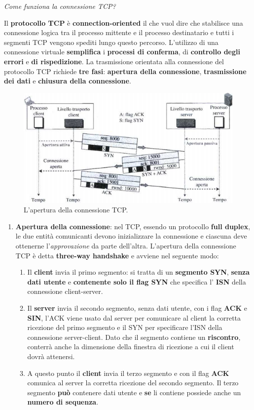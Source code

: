 \documentclass[11pt,a4paper]{article}
\theoremstyle{definition}
\begin{document}
\begin{flushleft}
	\textit{Come funziona la connessione TCP?}
\end{flushleft}
Il \textbf{protocollo TCP} è \textbf{connection-oriented} il che vuol dire che stabilisce una connessione logica tra il processo mittente e il processo destinatario e tutti i segmenti TCP vengono spediti lungo questo percorso. L'utilizzo di una connessione virtuale \textbf{semplifica} i \textbf{processi di conferma}, di \textbf{controllo degli errori} e \textbf{di rispedizione}. La trasmissione orientata alla connessione del protocollo TCP richiede \textbf{tre fasi}: \textbf{apertura della connessione}, \textbf{trasmissione dei dati} e \textbf{chiusura della connessione}.
\begin{figure}[!h]
	\includegraphics[scale=0.44]{Immagini/Three_way.png}
	\centering
	\caption{L'apertura della connessione TCP.}
\end{figure}
\newpage
\begin{enumerate}
	\item \textbf{Apertura della connessione}: nel TCP, essendo un protocollo \textbf{full duplex}, le due entità comunicanti devono inizializzare la connessione e ciascuna deve ottenerne l'\textit{approvazione} da parte dell'altra. L'apertura della connessione TCP è detta \textbf{three-way handshake} e avviene nel seguente modo:
	      \begin{enumerate}[label*=\arabic*.]
		      \item Il \textbf{client} invia il primo segmento: si tratta di un \textbf{segmento SYN}, \textbf{senza dati utente} e \textbf{contenente solo il flag SYN} che specifica l' \textbf{ISN} della connessione client-server.
		      \item Il \textbf{server} invia il secondo segmento, senza dati utente, con i flag \textbf{ACK} e \textbf{SIN}, l'ACK viene usato dal server per comunicare al client la corretta ricezione del primo segmento e il SYN per specificare l'ISN della connessione server-client. Dato che il segmento contiene un \textbf{riscontro}, conterrà anche la dimensione della finestra di ricezione a cui il client dovrà attenersi.
		      \item A questo punto il \textbf{client} invia il terzo segmento e con il flag \textbf{ACK} comunica al server la corretta ricezione del secondo segmento. Il terzo segmento \textbf{può} contenere dati utente e \textbf{se} li contiene possiede anche un \textbf{numero di sequenza}.
	      \end{enumerate}
\end{enumerate}
\end{document}
